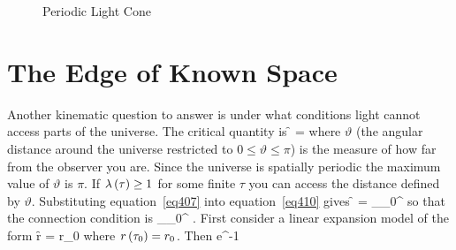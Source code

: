 \begin{figure}[htbp]
\begin{center}
\caption{Periodic Light Cone}\label{periodicU}
\end{center}
\end{figure}
\section{The Edge of Known Space}
Another kinematic question to answer is under what conditions light cannot access parts of the universe. The critical quantity is 
\be\label{eq410}
\f{\lambda}{\tau} = 
\ee
where $\vartheta$ (the angular distance around the universe restricted to $0\le\vartheta\le\pi$) is the measure of how far from 
the observer you are. Since the universe is
spatially periodic the maximum value of $\vartheta$ is $\pi$.  If ${\lambda}\left ( {\tau} \right ) \ge 1$ for some finite $\tau$ you can access the 
distance defined by $\vartheta$.  Substituting equation~\ref{eq407} into equation~\ref{eq410} gives
\be
 \f{\lambda}{\tau} = \int_{\tau_{0}}^{\tau}
\ee
so that the connection condition is
\be
 \int_{\tau_{0}}^{\tau} \ge \vartheta.
\ee
First consider a linear expansion model of the form 
\be
\f{r}{\tau} = r_{0}
\ee
where ${r}\left ( {\tau_{0}} \right ) = r_{0}$.  Then
\be
{} \ge {}e^{\alpha\vartheta{}}-1
\ee

